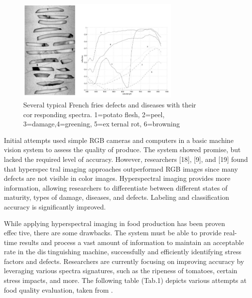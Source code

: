 \documentclass{article}
\begin{document}
{                 \begin{figure}[h]
                    \centering
                    \includegraphics[width=0.72\textwidth]{Figures/potatoParts.PNG}
                    \caption{Several typical French fries defects and diseases with their corresponding spectra. 1=potato flesh, 2=peel, 3=damage,4=greening, 5=external rot, 6=browning}
                    \label{fig:my_label}
                \end{figure}
                
                Initial attempts used simple RGB cameras and computers in a basic machine vision system to assess the quality of produce. The system showed promise, but lacked the required level of accuracy. However, researchers [18], [9], and [19] found that hyperspectral imaging approaches outperformed RGB images since many defects are not visible in color images. Hyperspectral imaging provides more information, allowing researchers to differentiate between different states of maturity, types of damage, diseases, and defects. Labeling and classification accuracy is significantly improved.\par
                While applying hyperspectral imaging in food production has been proven effective, there are some drawbacks. The system must be able to provide real-time results and process a vast amount of information to maintain an acceptable rate in the distinguishing machine, successfully and efficiently identifying stress factors and defects. Researchers are currently focusing on improving accuracy by leveraging various spectra signatures, such as the ripeness of tomatoes, certain stress impacts, and more. The following table (Tab.1) depicts various attempts at food quality evaluation, taken from \cite{DuSun}.\par
                
                \begin{table}[h]
                \centering
                \caption{CCD Camera Applications for Food Quality Evaluation}
                \vspace*{2\baselineskip}
                \label{tab:food-quality}
\end{table}}
\end{document}
